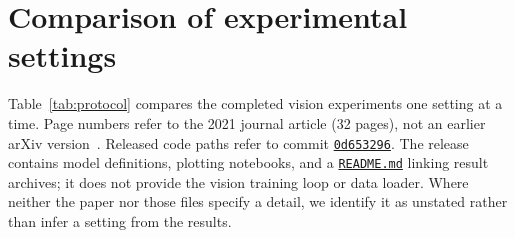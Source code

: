 \section{Comparison of experimental settings}\label{app:protocol}
Table~\ref{tab:protocol} compares the completed vision experiments one
setting at a time. Page numbers refer to the 2021 journal article
(32 pages), not an earlier arXiv version~\cite{nakkiran2021deepdouble}.
Released code paths refer to commit
\href{https://gitlab.com/harvard-machine-learning/double-descent/-/tree/0d653296f870e6bf7ee82dc71b4f7b49d53fa85d}{\texttt{0d653296}}.
The release contains model definitions, plotting notebooks, and a
\href{https://gitlab.com/harvard-machine-learning/double-descent/-/blob/0d653296f870e6bf7ee82dc71b4f7b49d53fa85d/README.md}{\texttt{README.md}}
linking result archives; it does not provide the vision training loop or
data loader. Where neither the paper nor those files specify a detail,
we identify it as unstated rather than infer a setting from the results.

